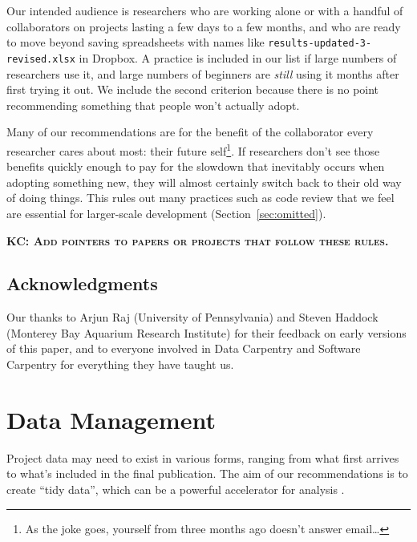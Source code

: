 \documentclass[10pt]{article}
\newcommand{\fixme}[2]{\textsc{\textbf{{#1}: {#2}}}}
\begin{document}
Our intended audience is researchers who are working alone or with a
handful of collaborators on projects lasting a few days to a few
months, and who are ready to move beyond saving spreadsheets with
names like \texttt{results-updated-3-revised.xlsx} in Dropbox. A
practice is included in our list if large numbers of researchers use
it, and large numbers of beginners are \emph{still} using it months
after first trying it out. We include the second criterion because
there is no point recommending something that people won't actually
adopt.

Many of our recommendations are for the benefit of the collaborator
every researcher cares about most: their future self\footnote{As the
  joke goes, yourself from three months ago doesn't answer
  email{\ldots}}. If researchers don't see those benefits quickly
enough to pay for the slowdown that inevitably occurs when adopting
something new, they will almost certainly switch back to their old way
of doing things.  This rules out many practices such as code review
that we feel are essential for larger-scale development
(Section~\ref{sec:omitted}).

\fixme{KC}{Add pointers to papers or projects that follow these rules.}

\subsection*{Acknowledgments}

Our thanks to Arjun Raj (University of Pennsylvania) and Steven
Haddock (Monterey Bay Aquarium Research Institute) for their feedback
on early versions of this paper, and to everyone involved in Data
Carpentry and Software Carpentry for everything they have taught us.

\section{Data Management}\label{sec:data}

Project data may need to exist in various forms, ranging from what
first arrives to what's included in the final publication.  The aim of
our recommendations is to create ``tidy data'', which can be a
powerful accelerator for analysis \cite{wickham2014,hart2015}.
\end{document}

